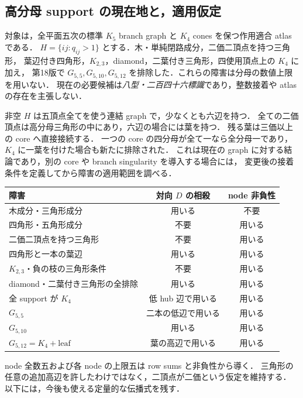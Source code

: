 \subsection{高分母 support の現在地と，適用仮定}
\label{ns18:current-support}

対象は，全平面五次の標準 $K_5$ branch graph と $K_4$ cones を保つ作用適合 atlas である．
$H=\{ij:q_{ij}>1\}$ とする．木・単純閉路成分，二価二頂点を持つ三角形，
葉辺付き四角形，$K_{2,3}$，diamond，二葉付き三角形，四使用頂点上の $K_4$ に加え，
第18版で $G_{5,5},G_{5,10},G_{5,12}$ を排除した．これらの障害は分母の数値上限を用いない．
現在の必要候補は\emph{八型・二百四十六標識}であり，整数接着や atlas の存在を主張しない．

非空 $H$ は五頂点全てを使う連結 graph で，少なくとも六辺を持つ．
全ての二価頂点は高分母三角形の中にあり，六辺の場合には葉を持つ．
残る葉は三価以上の core へ直接接続する．
一つの core の四分母が全て一なら全分母一であり，$K_4$ に一葉を付けた場合も新たに排除された．
これは現在の graph に対する結論であり，別の core や branch singularity を導入する場合には，
変更後の接着条件を定義してから障害の適用範囲を調べる．

\begin{center}
\begin{tabular}{lcc}
障害 & 対向 $D$ の相殺 & node 非負性\\\hline
木成分・三角形成分 & 用いる & 不要\\
四角形・五角形成分 & 不要 & 用いる\\
二価二頂点を持つ三角形 & 不要 & 用いる\\
四角形と一本の葉辺 & 用いる & 用いる\\
$K_{2,3}$・負の枝の三角形条件 & 不要 & 用いる\\
diamond・二葉付き三角形の全排除 & 用いる & 用いる\\
全 support が $K_4$ & 低 hub 辺で用いる & 用いる\\
$G_{5,5}$ & 二本の低辺で用いる & 用いる\\
$G_{5,10}$ & 用いる & 用いる\\
$G_{5,12}=K_4+\mathrm{leaf}$ & 葉の高辺で用いる & 用いる
\end{tabular}
\end{center}
node 全数五および各 node の上限五は row sums と非負性から導く．
三角形の任意の追加高辺を許したわけではなく，二頂点が二価という仮定を維持する．
以下には，今後も使える定量的な伝播式を残す．



